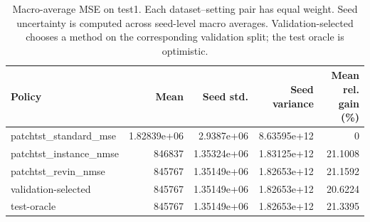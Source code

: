 \begin{table}[htbp]
\centering
\caption{Macro-average MSE on test1. Each dataset--setting pair has equal weight. Seed uncertainty is computed across seed-level macro averages. Validation-selected chooses a method on the corresponding validation split; the test oracle is optimistic.}
\begin{tabular}{lrrrr}
\toprule
Policy & Mean & Seed std. & Seed variance & Mean rel. gain (\%) \\
\midrule
patchtst\_standard\_mse & 1.82839e+06 & 2.9387e+06 & 8.63595e+12 & 0 \\
patchtst\_instance\_nmse & 846837 & 1.35324e+06 & 1.83125e+12 & 21.1008 \\
patchtst\_revin\_nmse & 845767 & 1.35149e+06 & 1.82653e+12 & 21.1592 \\
validation-selected & 845767 & 1.35149e+06 & 1.82653e+12 & 20.6224 \\
\midrule
test-oracle & 845767 & 1.35149e+06 & 1.82653e+12 & 21.3395 \\
\bottomrule
\end{tabular}
\end{table}
